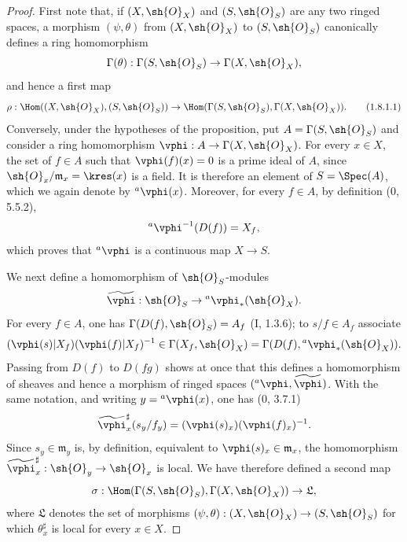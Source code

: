 \begin{proof}
First note that, if $(X,\sh{O}_X)$ and $(S,\sh{O}_S)$ are any two
ringed spaces, a morphism $(\psi,\theta)$ from $(X,\sh{O}_X)$ to
$(S,\sh{O}_S)$ canonically defines a ring homomorphism
\[
  \Gamma(\theta):\Gamma(S,\sh{O}_S)\to\Gamma(X,\sh{O}_X),
\]
and hence a first map
\begin{equation}
\label{ega2:addendum:I.1.8.1.1}
  \rho:\Hom((X,\sh{O}_X),(S,\sh{O}_S))
  \to\Hom(\Gamma(S,\sh{O}_S),\Gamma(X,\sh{O}_X)).
\tag{1.8.1.1}
\end{equation}
Conversely, under the hypotheses of the proposition, put
$A=\Gamma(S,\sh{O}_S)$ and consider a ring homomorphism
$\vphi:A\to\Gamma(X,\sh{O}_X)$.  For every $x\in X$, the set of
$f\in A$ such that $\vphi(f)(x)=0$ is a prime ideal of $A$, since
$\sh{O}_x/\mathfrak{m}_x=\kres(x)$ is a field.  It is therefore an
element of $S=\Spec(A)$, which we again denote by ${}^a\vphi(x)$.
Moreover, for every $f\in A$, by definition (0, 5.5.2),
\[
  {}^a\vphi^{-1}(D(f))=X_f,
\]
which proves that ${}^a\vphi$ is a continuous map $X\to S$.

We next define a homomorphism of $\sh{O}_S$-modules
\[
  \widetilde{\vphi}:\sh{O}_S\to{}^a\vphi_*(\sh{O}_X).
\]
For every $f\in A$, one has
$\Gamma(D(f),\sh{O}_S)=A_f$ (I, 1.3.6); to $s/f\in A_f$ associate
\[
  (\vphi(s)|X_f)(\vphi(f)|X_f)^{-1}
  \in\Gamma(X_f,\sh{O}_X)
  =\Gamma(D(f),{}^a\vphi_*(\sh{O}_X)).
\]
Passing from $D(f)$ to $D(fg)$ shows at once that this defines a
homomorphism of sheaves and hence a morphism of ringed spaces
$({}^a\vphi,\widetilde{\vphi})$.  With the same notation, and writing
$y={}^a\vphi(x)$, one has (0, 3.7.1)
\[
  \widetilde{\vphi}_x^\sharp(s_y/f_y)
  =(\vphi(s)_x)(\vphi(f)_x)^{-1}.
\]
Since $s_y\in\mathfrak{m}_y$ is, by definition, equivalent to
$\vphi(s)_x\in\mathfrak{m}_x$, the homomorphism
$\widetilde{\vphi}_x^\sharp:\sh{O}_y\to\sh{O}_x$ is local.  We have
therefore defined a second map
\[
  \sigma:\Hom(\Gamma(S,\sh{O}_S),\Gamma(X,\sh{O}_X))
  \to\mathfrak{L},
\]
where $\mathfrak{L}$ denotes the set of morphisms
$(\psi,\theta):(X,\sh{O}_X)\to(S,\sh{O}_S)$ for which
$\theta_x^\sharp$ is local for every $x\in X$.


\end{proof}
